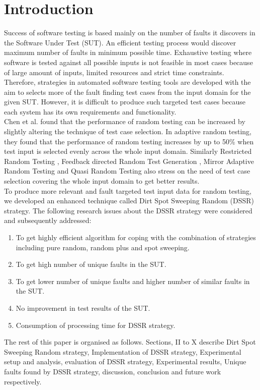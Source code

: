 \documentclass[conference]{IEEEtran}
\begin{document}
\section{Introduction}
Success of software testing is based mainly on the number of faults it discovers in the Software Under Test (SUT). An efficient testing process would discover maximum number of faults in minimum possible time. Exhaustive testing where software is tested against all possible inputs is not feasible in most cases because of large amount of inputs, limited resources and strict time constraints. Therefore, strategies in automated software testing tools are developed with the aim to selects more of the fault finding test cases from the input domain for the given SUT. However, it is difficult to produce such targeted test cases because each system has its own requirements and functionality.\\
\indent Chen et al.  \cite{Chen2008} found that the performance of random testing can be increased by slightly altering the technique of test case selection. In adaptive random testing, they found that the performance of random testing increases by up to 50\% when test input is selected evenly across the whole input domain. Similarly Restricted Random Testing \cite{Chan2002}, Feedback directed Random Test Generation \cite{Pacheco2007a}, Mirror Adaptive Random Testing \cite{Chen2003} and Quasi Random Testing \cite{Chen2005} also stress on the need of test case selection covering the whole input domain to get better results. \\
\indent To produce more relevant and fault targeted test input data for random testing, we developed an enhanced technique called Dirt Spot Sweeping Random (DSSR) strategy.  The following research issues about the DSSR strategy were considered and subsequently addressed:
\begin{enumerate}

\item To get highly efficient algorithm for coping with the combination of strategies including pure random, random plus and spot sweeping.

\item To get high number of unique faults in the SUT. 

\item To get  lower number of unique faults and higher number of similar faults in the SUT.

\item  No improvement in test results of the SUT. 

\item  Consumption of processing time for DSSR strategy.

\end{enumerate}
The rest of this paper is organised as follows. Sections, II to X describe Dirt Spot Sweeping Random strategy, Implementation of DSSR strategy, Experimental setup and analysis, evaluation of DSSR strategy, Experimental results, Unique faults found by DSSR strategy, discussion, conclusion and future work respectively.
\end{document}
